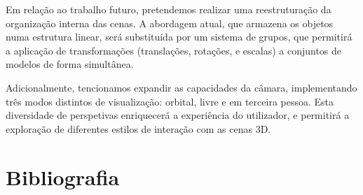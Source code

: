\documentclass[12pt, a4paper]{article}
\begin{document}
Em relação ao trabalho futuro, pretendemos realizar uma reestruturação da organização interna das
cenas. A abordagem atual, que armazena os objetos numa estrutura linear, será substituída por um
sistema de grupos, que permitirá a aplicação de transformações (translações, rotações, e escalas) a
conjuntos de modelos de forma simultânea.

Adicionalmente, tencionamos expandir as capacidades da câmara, implementando três modos distintos de
visualização: orbital, livre e em terceira pessoa. Esta diversidade de perspetivas enriquecerá a
experiência do utilizador, e permitirá a exploração de diferentes estilos de interação com as cenas
3D.

\begingroup
\section{Bibliografia}
\renewcommand{\section}[2]{}
\end{document}
